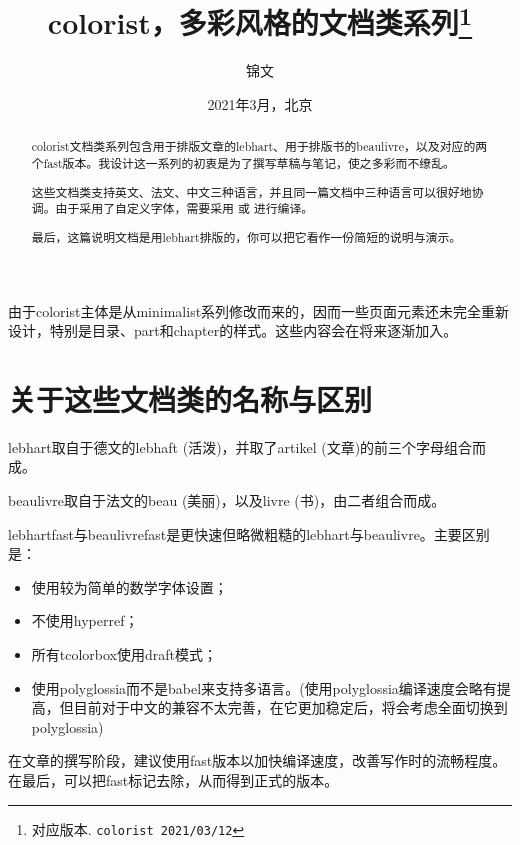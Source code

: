 \documentclass{lebhart}
\providecommand{\colorist}{\textsf{colorist}}
\providecommand{\lebhart}{\textsf{lebh\-art}}
\providecommand{\lebhartfast}{\textsf{lebh\-art\-fast}}
\providecommand{\beaulivre}{\textsf{beau\-livre}}
\providecommand{\beaulivrefast}{\textsf{beau\-livre\-fast}}
\begin{document}
\title{\colorist{}，多彩风格的文档类系列\thanks{对应版本. \texttt{\colorist{} 2021/03/12}}}
\author{锦文}
\date{2021年3月，北京}

\maketitle

\begin{abstract}
    \colorist{}文档类系列包含用于排版文章的\lebhart{}、用于排版书的\beaulivre{}，以及对应的两个fast版本。我设计这一系列的初衷是为了撰写草稿与笔记，使之多彩而不缭乱。

    这些文档类支持英文、法文、中文三种语言，并且同一篇文档中三种语言可以很好地协调。由于采用了自定义字体，需要采用  或  进行编译。
    
    最后，这篇说明文档是用\lebhart{}排版的，你可以把它看作一份简短的说明与演示。
\end{abstract}

\begin{tcolorbox}[enhanced jigsaw,pad at break*=1mm,breakable,colback=yellow!25!paper,boxrule=0pt,frame hidden]
    由于\colorist{}主体是从\textsf{minimalist}系列修改而来的，因而一些页面元素还未完全重新设计，特别是目录、part和chapter的样式。这些内容会在将来逐渐加入。
\end{tcolorbox}

\tableofcontents

\section{关于这些文档类的名称与区别}
\lebhart{}取自于德文的lebhaft (活泼)，并取了artikel (文章)的前三个字母组合而成。

\beaulivre{}取自于法文的beau (美丽)，以及livre (书)，由二者组合而成。

\lebhartfast{}与\beaulivrefast{}是更快速但略微粗糙的\lebhart{}与\beaulivre{}。主要区别是：
\begin{itemize}
    \item 使用较为简单的数学字体设置；
    \item 不使用hyperref；
    \item 所有tcolorbox使用draft模式；
    \item 使用polyglossia而不是babel来支持多语言。(使用polyglossia编译速度会略有提高，但目前对于中文的兼容不太完善，在它更加稳定后，将会考虑全面切换到polyglossia)
\end{itemize}

在文章的撰写阶段，建议使用fast版本以加快编译速度，改善写作时的流畅程度。在最后，可以把fast标记去除，从而得到正式的版本。
\end{document}
